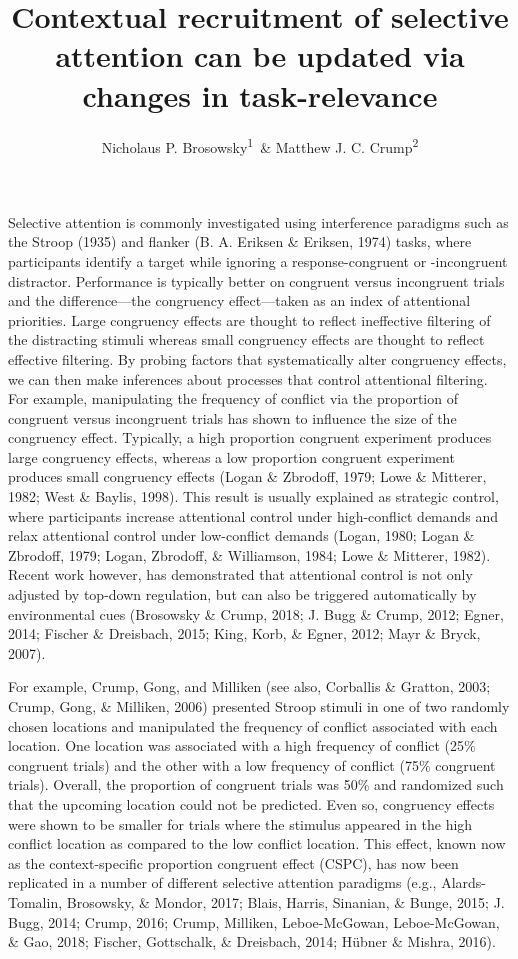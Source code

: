 \documentclass[english,,man,floatsintext]{apa6}
\title{Contextual recruitment of selective attention can be updated via changes
in task-relevance}
\author{Nicholaus P. Brosowsky\textsuperscript{1}~\& Matthew J. C.
Crump\textsuperscript{2}}
\date{}
\affiliation{
\vspace{0.5cm}
\textsuperscript{1} The Graduate Center of the City University of New York\\\textsuperscript{2} Brooklyn College of the City University of New York}
\begin{document}
\maketitle

Selective attention is commonly investigated using interference
paradigms such as the Stroop (1935) and flanker (B. A. Eriksen \&
Eriksen, 1974) tasks, where participants identify a target while
ignoring a response-congruent or -incongruent distractor. Performance is
typically better on congruent versus incongruent trials and the
difference---the congruency effect---taken as an index of attentional
priorities. Large congruency effects are thought to reflect ineffective
filtering of the distracting stimuli whereas small congruency effects
are thought to reflect effective filtering. By probing factors that
systematically alter congruency effects, we can then make inferences
about processes that control attentional filtering. For example,
manipulating the frequency of conflict via the proportion of congruent
versus incongruent trials has shown to influence the size of the
congruency effect. Typically, a high proportion congruent experiment
produces large congruency effects, whereas a low proportion congruent
experiment produces small congruency effects (Logan \& Zbrodoff, 1979;
Lowe \& Mitterer, 1982; West \& Baylis, 1998). This result is usually
explained as strategic control, where participants increase attentional
control under high-conflict demands and relax attentional control under
low-conflict demands (Logan, 1980; Logan \& Zbrodoff, 1979; Logan,
Zbrodoff, \& Williamson, 1984; Lowe \& Mitterer, 1982). Recent work
however, has demonstrated that attentional control is not only adjusted
by top-down regulation, but can also be triggered automatically by
environmental cues (Brosowsky \& Crump, 2018; J. Bugg \& Crump, 2012;
Egner, 2014; Fischer \& Dreisbach, 2015; King, Korb, \& Egner, 2012;
Mayr \& Bryck, 2007).

For example, Crump, Gong, and Milliken (see also, Corballis \& Gratton,
2003; Crump, Gong, \& Milliken, 2006) presented Stroop stimuli in one of
two randomly chosen locations and manipulated the frequency of conflict
associated with each location. One location was associated with a high
frequency of conflict (25\% congruent trials) and the other with a low
frequency of conflict (75\% congruent trials). Overall, the proportion
of congruent trials was 50\% and randomized such that the upcoming
location could not be predicted. Even so, congruency effects were shown
to be smaller for trials where the stimulus appeared in the high
conflict location as compared to the low conflict location. This effect,
known now as the context-specific proportion congruent effect (CSPC),
has now been replicated in a number of different selective attention
paradigms (e.g., Alards-Tomalin, Brosowsky, \& Mondor, 2017; Blais,
Harris, Sinanian, \& Bunge, 2015; J. Bugg, 2014; Crump, 2016; Crump,
Milliken, Leboe-McGowan, Leboe-McGowan, \& Gao, 2018; Fischer,
Gottschalk, \& Dreisbach, 2014; Hübner \& Mishra, 2016).
\end{document}
